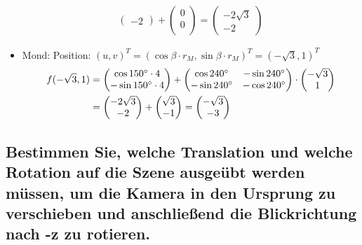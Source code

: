 \documentclass[a4paper,10pt,DIV=14]{scrartcl}
\begin{document}
\begin{itemize}
\begin{align*}
\begin{pmatrix}
-2
\end{pmatrix}
+ 
\begin{pmatrix}
0 \\
0 \\
\end{pmatrix}
= \begin{pmatrix}
-2\sqrt{3} \\
-2
\end{pmatrix}
\end{align*}
\item Mond: Position: $(u,v)^T = (\cos\beta \cdot r_M, \sin\beta \cdot r_M)^T = (-\sqrt{3}, 1)^T$
\begin{align*}
f(-\sqrt{3}, 1) &=
\begin{pmatrix}
\cos 150\degree \cdot 4 \\
-\sin 150\degree \cdot 4 \\
\end{pmatrix}
+ 
\begin{pmatrix}
\cos 240\degree & -\sin 240\degree \\
-\sin 240\degree & -\cos 240\degree \\
\end{pmatrix}
\cdot
\begin{pmatrix}
-\sqrt{3} \\
1 \\
\end{pmatrix}
\\
&=
\begin{pmatrix}
-2\sqrt{3} \\
-2
\end{pmatrix}
+ 
\begin{pmatrix}
\sqrt{3} \\
-1  \\
\end{pmatrix}
= \begin{pmatrix}
-\sqrt{3} \\
-3
\end{pmatrix}
\end{align*}
\end{itemize}


\subsection{Bestimmen Sie, welche Translation und welche Rotation auf die Szene ausgeübt werden müssen, um die Kamera in den Ursprung zu verschieben und anschließend die Blickrichtung nach -z zu rotieren.}
\end{document}
